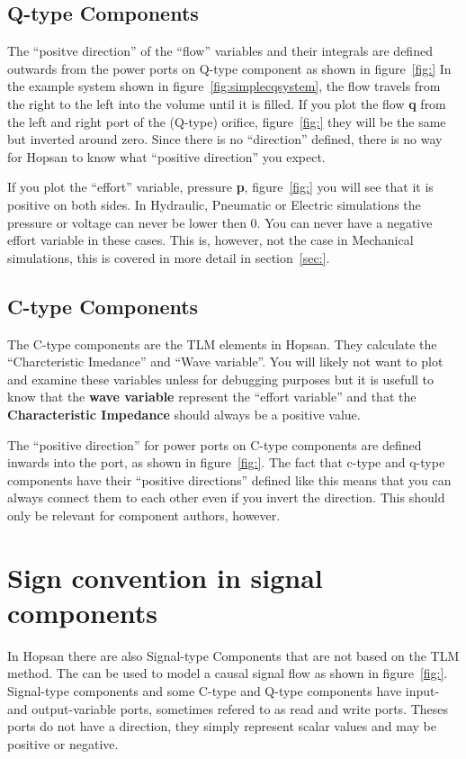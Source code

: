 \documentclass[a4paper,pdftex]{article}
\begin{document}
\subsection*{Q-type Components}
The \enquote{positve direction} of the \enquote{flow} variables and their integrals are defined outwards from the power ports on Q-type component as shown in figure~\ref{fig:}
In the example system shown in figure~\ref{fig:simplecqsystem}, the flow travels from the right  to the left into the volume until it is filled.
If you plot the flow \textbf{q} from the left and right port of the (Q-type) orifice, figure~\ref{fig:} they will be the same but inverted around zero.
Since there is no \enquote{direction} defined, there is no way for Hopsan to know what \enquote{positive direction} you expect.

If you plot the \enquote{effort} variable, pressure \textbf{p}, figure~\ref{fig:} you will see that it is positive on both sides.
In Hydraulic, Pneumatic or Electric simulations the pressure or voltage can never be lower then 0. 
You can never have a negative effort variable in these cases.
This is, however, not the case in Mechanical simulations, this is covered in more detail in section~\ref{sec:}.

\subsection*{C-type Components}
The C-type components are the TLM elements in Hopsan. 
They calculate the \enquote{Charcteristic Imedance} and \enquote{Wave variable}. 
You will likely not want to plot and examine these variables unless for debugging purposes but it is usefull to know that the \textbf{wave variable} represent the \enquote{effort variable} and that the \textbf{Characteristic Impedance} should always be a positive value.

The \enquote{positive direction} for power ports on C-type components are defined inwards into the port, as shown in figure~\ref{fig:}. 
The fact that c-type and q-type components have their \enquote{positive directions} defined like this means that you can always connect them to each other even if you invert the direction. 
This should only be relevant for component authors, however.


\section*{Sign convention in signal components}
In Hopsan there are also Signal-type Components that are not based on the TLM method.
The can be used to model a causal signal flow as shown in figure~\ref{fig:}.
Signal-type components and some C-type and Q-type components have input- and output-variable ports, sometimes refered to as read and write ports.
Theses ports do not have a direction, they simply represent scalar values and may be positive or negative.
\end{document}
